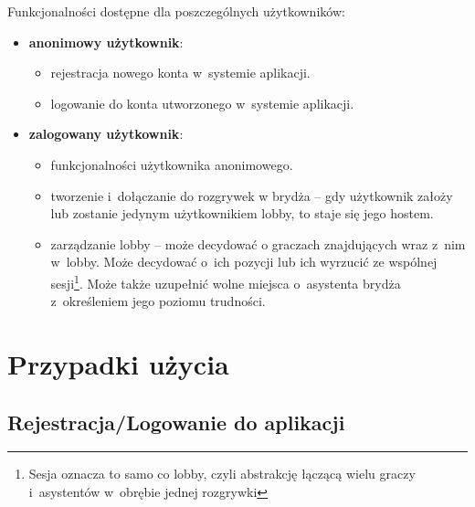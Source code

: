 Funkcjonalności dostępne dla poszczególnych użytkowników:
\begin{itemize}
  \item \textbf{anonimowy użytkownik}:
        \begin{itemize}
          \item rejestracja nowego konta w~systemie aplikacji.
          \item logowanie do konta utworzonego w~systemie aplikacji.
        \end{itemize}

  \item \textbf{zalogowany użytkownik}:
        \begin{itemize}
          \item funkcjonalności użytkownika anonimowego.
          \item tworzenie i~dołączanie do rozgrywek w brydża --
                gdy użytkownik założy lub zostanie jedynym
                użytkownikiem lobby, to staje się jego
                hostem.
          \item zarządzanie lobby -- może decydować o graczach znajdujących wraz
                z~nim w~lobby. Może decydować o~ich pozycji lub ich wyrzucić
                ze wspólnej sesji\footnote{Sesja oznacza to samo co lobby, czyli
                  abstrakcję łączącą wielu graczy i~asystentów w~obrębie jednej
                  rozgrywki}.
                Może także uzupełnić wolne miejsca o~asystenta brydża z~określeniem jego
                poziomu trudności.
        \end{itemize}
\end{itemize}

\FloatBarrier

\section{Przypadki użycia}

\subsection{Rejestracja/Logowanie do aplikacji}

